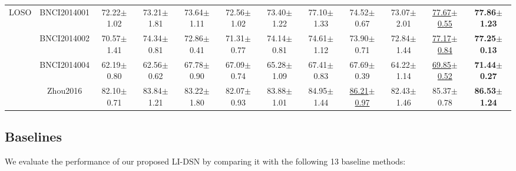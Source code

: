 \documentclass[journal]{IEEEtran}
\theoremstyle{plain}
\begin{document}
\begin{table}[!t]
\begin{tabular}{c|c|cccccccccc}
\hline
\multirow{4}{*}{\centering LOSO} & BNCI2014001 & 72.22$\pm$1.02 & 73.21$\pm$1.81 & 73.64$\pm$1.11 & 72.56$\pm$1.02 & 73.40$\pm$1.22 & 77.10$\pm$1.33 & 74.52$\pm$0.67 & 73.07$\pm$2.01 & \underline{77.67$\pm$0.55} & \textbf{77.86$\pm$1.23} \\
& BNCI2014002 & 70.57$\pm$1.41 & 74.34$\pm$0.81 & 72.86$\pm$0.41 & 71.31$\pm$0.77 & 74.14$\pm$0.81 & 74.61$\pm$1.12 & 73.90$\pm$0.71 & 72.84$\pm$1.44 & \underline{77.17$\pm$0.84} & \textbf{77.25$\pm$0.13} \\
& BNCI2014004 & 62.19$\pm$0.80 & 62.56$\pm$0.62 & 67.78$\pm$0.90 & 67.09$\pm$0.74 & 65.28$\pm$1.09 & 67.41$\pm$0.83 & 67.69$\pm$0.39 & 64.22$\pm$1.14 & \underline{69.85$\pm$0.52} & \textbf{71.44$\pm$0.27} \\
& Zhou2016 & 82.10$\pm$0.71 & 83.84$\pm$1.21 & 83.22$\pm$1.80 & 82.07$\pm$0.93 & 83.88$\pm$1.01 & 84.95$\pm$1.44 & \underline{86.21$\pm$0.97} & 82.43$\pm$1.46 & 85.37$\pm$0.78 & \textbf{86.53$\pm$1.24} \\

\hline
\hline
\end{tabular}
\label{tab:mi}
\end{table}

\subsection{Baselines}
We evaluate the performance of our proposed LI-DSN by comparing it with the following 13 baseline methods:
\end{document}

